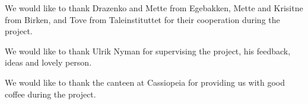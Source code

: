 We would like to thank Drazenko and Mette from Egebakken, Mette and Krisitne from Birken, and Tove from Taleinstituttet for their cooperation during the project.

We would like to thank Ulrik Nyman for supervising the project, his feedback, ideas and lovely person.

We would like to thank the canteen at Cassiopeia for providing us with good coffee during the project. 